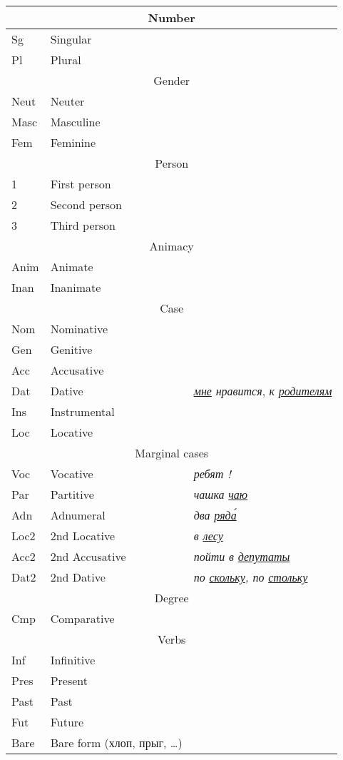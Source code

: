\documentclass[a4paper,11pt, onecolumn,twoside]{article}
\begin{document}
\begin{tabular}{lll}
\multicolumn{3}{c}{Number} \\
\hline
Sg  & Singular & ~ \\
Pl  & Plural & ~ \\
\multicolumn{3}{c}{Gender} \\
\hline
Neut & Neuter & ~ \\
Masc & Masculine & ~ \\
Fem & Feminine& ~ \\
\multicolumn{3}{c}{Person} \\
\hline
1 & First person & ~ \\
2 & Second person & ~ \\
3 & Third person & ~ \\
\multicolumn{3}{c}{Animacy} \\
\hline
Anim & Animate & ~ \\
Inan & Inanimate & ~ \\
\multicolumn{3}{c}{Case} \\
\hline
Nom & Nominative &  \\
Gen & Genitive & ~ \\
Acc & Accusative &  \\
Dat & Dative & \emph{\underline{мне} нравится}, \emph{к \underline{родителям}} \\
Ins & Instrumental & ~ \\
Loc & Locative & ~ \\
\multicolumn{3}{c}{Marginal cases} \\
\hline
Voc & Vocative & \emph{ребят !} \\
Par & Partitive & \emph{чашка \underline{чаю}} \\
Adn & Adnumeral & \emph{два \underline{ряда́}} \\
Loc2 & 2nd Locative & \emph{в \underline{лесу}} \\
Acc2 & 2nd Accusative & \emph{пойти в \underline{депутаты}} \\
Dat2 & 2nd Dative & \emph{по \underline{скольку}, по \underline{стольку}} \\
\multicolumn{3}{c}{Degree} \\
\hline
Cmp & Comparative & ~ \\
\multicolumn{3}{c}{Verbs} \\
\hline
Inf & Infinitive & ~ \\
Pres & Present   & ~ \\
Past & Past & ~ \\
Fut & Future    & ~ \\
Bare & Bare form (хлоп, прыг, \ldots)    & ~ \\


\end{tabular}
\end{document}

